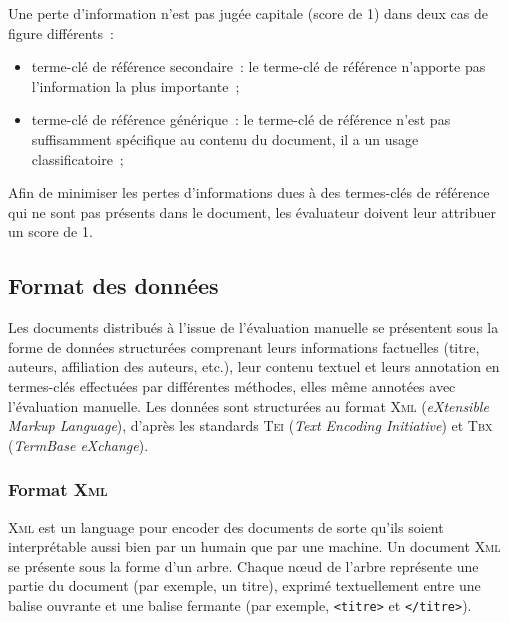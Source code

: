         Une perte d'information n'est pas jugée capitale (score de 1) dans deux
        cas de figure différents~:
        \begin{itemize}
          \item{terme-clé de référence secondaire~: le terme-clé de référence
                n'apporte pas l'information la plus importante~;}
          \item{terme-clé de référence générique~: le terme-clé de référence
                n'est pas suffisamment spécifique au contenu du document, il a
                un usage classificatoire~;}
        \end{itemize}
        Afin de minimiser les pertes d'informations dues à des termes-clés de
        référence qui ne sont pas présents dans le document, les évaluateur
        doivent leur attribuer un score de 1.



    \subsection{Format des données}
    \label{subsec:main-automatic_evaluation_of_keyphrase_annotation-methodology-data_format}
      Les documents distribués à l'issue de l'évaluation manuelle se présentent
      sous la forme de données structurées comprenant leurs
      informations factuelles (titre, auteurs, affiliation des auteurs, etc.),
      leur contenu textuel et leurs annotation en termes-clés effectuées par
      différentes méthodes, elles même annotées avec l'évaluation manuelle. Les
      données sont structurées au format \textsc{Xml} (\textit{eXtensible Markup
      Language}), d'après les standards \textsc{Tei} (\textit{Text Encoding
      Initiative}) et \textsc{Tbx} (\textit{TermBase eXchange}).

      \subsubsection{Format \textsc{Xml}}
      \label{subsubsec:main-automatic_evaluation_of_keyphrase_annotation-methodology-data_format-xml}
        \textsc{Xml} est un language pour encoder des documents de sorte qu'ils
        soient interprétable aussi bien par un humain que par une machine. Un
        document \textsc{Xml} se présente sous la forme d'un arbre. Chaque
        n\oe{}ud de l'arbre représente une partie du document (par exemple, un
        titre), exprimé textuellement entre une balise ouvrante et une balise
        fermante (par exemple, \texttt{<titre>} et \texttt{</titre>}).

